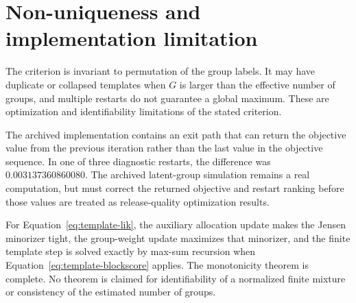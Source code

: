 \begin{algorithm}[H]
\caption{Alternating optimization for finite latent-group templates}
\label{alg:multi-em}
\end{algorithm}

\section{Non-uniqueness and implementation limitation}
The criterion is invariant to permutation of the group labels. It may have duplicate or collapsed
templates when $G$ is larger than the effective number of groups, and multiple restarts do not
guarantee a global maximum. These are optimization and identifiability limitations of the stated
criterion.

The archived implementation contains an exit path that can return the objective value from the
previous iteration rather than the last value in the objective sequence. In one of three diagnostic
restarts, the difference was $0.003137360860080$. The archived latent-group simulation remains a
real computation, but  must correct the returned objective and restart ranking
before those values are treated as release-quality optimization results.

\begin{statusbox}
For Equation~\eqref{eq:template-lik}, the auxiliary allocation update makes the Jensen minorizer
tight, the group-weight update maximizes that minorizer, and the finite template step is solved
exactly by max-sum recursion when Equation~\eqref{eq:template-blockscore} applies. The monotonicity
theorem is complete. No theorem is claimed for identifiability of a normalized finite mixture or
consistency of the estimated number of groups.
\end{statusbox}

